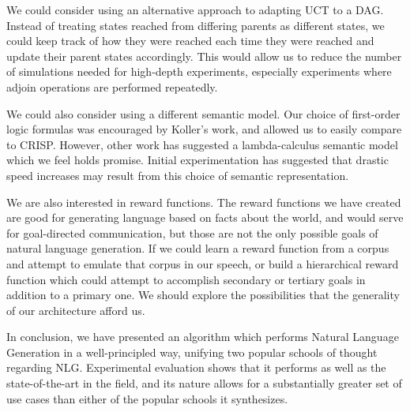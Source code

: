We could consider using an alternative approach to adapting UCT to a DAG.  Instead
of treating states reached from differing parents as different states, we could keep
track of how they were reached each time they were reached and update their parent
states accordingly.  This would allow us to reduce the number of simulations needed
for high-depth experiments, especially experiments where adjoin operations are
performed repeatedly.

We could also consider using a different semantic model.  Our choice of first-order logic
formulas was encouraged by Koller's work, and allowed us to easily compare to CRISP.
However, other work has suggested a lambda-calculus semantic model \cite{wong2007learning}
which we feel holds promise.  Initial experimentation has suggested that drastic speed increases
may result from this choice of semantic representation.

We are also interested in reward functions.  The reward functions we have created
are good for generating language based on facts about the world, and would
serve for goal-directed communication, but those are not the only possible
goals of natural language generation.  If we could learn a reward function from
a corpus and attempt to emulate that corpus in our speech, or build a hierarchical
reward function which could attempt to accomplish secondary or tertiary goals
in addition to a primary one.  We should explore the possibilities that the
generality of our architecture afford us.

In conclusion, we have presented an algorithm which performs Natural Language
Generation in a well-principled way, unifying two popular schools of thought regarding
NLG.  Experimental evaluation shows that it performs as well as the state-of-the-art in
the field, and its nature allows for a substantially greater set of use cases than either
of the popular schools it synthesizes.